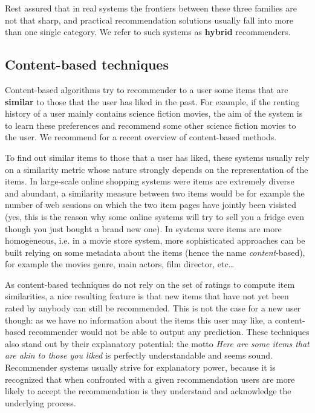 Rest assured that in real systems the frontiers between these three families
are not that sharp, and practical recommendation solutions usually fall into
more than one single category. We refer to such systems as \textbf{hybrid}
recommenders.

\subsection{Content-based techniques}

Content-based algorithms try to recommender to a user some items that are
\textbf{similar} to those that the user has liked in the past. For example, if
the renting history of a user mainly contains science fiction movies, the aim
of the system is to learn these preferences and recommend some other science
fiction movies to the user. We recommend \cite{LopGemSem11} for a recent
overview of content-based methods.

To find out similar items to those that a user has liked, these systems usually
rely on a similarity metric whose nature strongly depends on the representation
of the items. In large-scale online shopping systems were items are extremely
diverse and abundant, a similarity measure between two items would be for
example the number of web sessions on which the two item pages have jointly
been visisted (yes, this is the reason why some online systems will try to sell
you a fridge even though you just bought a brand new one). In systems were
items are more homogeneous, i.e. in a movie store system, more  sophisticated
approaches can be built relying on some metadata about the items (hence the
name \textit{content}-based), for example the movies genre, main actors, film
director, etc\dots

As content-based techniques do not rely on the set of ratings to compute item
similarities, a nice resulting feature is that new items that have not yet been
rated by anybody can still be recommended. This is not the case for a new user
though: as we have no information about the items this user may like, a
content-based recommender would not be able to output any prediction. These
techniques also stand out by their explanatory potential: the motto
\textit{Here are some items that are akin to those you liked} is perfectly
understandable and seems sound.  Recommender systems usually strive for
explanatory power, because it is recognized that when confronted with a given
recommendation users are more likely to accept the recommendation is they
understand and acknowledge the underlying process.

